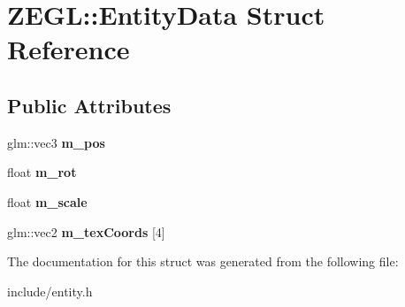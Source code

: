 \hypertarget{struct_z_e_g_l_1_1_entity_data}{}\section{Z\+E\+G\+L\+:\+:Entity\+Data Struct Reference}
\label{struct_z_e_g_l_1_1_entity_data}
\subsection*{Public Attributes}
\begin{DoxyCompactItemize}
\item 
\hypertarget{struct_z_e_g_l_1_1_entity_data_a766627340a91bddd339100545e291889}{}glm\+::vec3 {\bfseries m\+\_\+pos}\label{struct_z_e_g_l_1_1_entity_data_a766627340a91bddd339100545e291889}

\item 
\hypertarget{struct_z_e_g_l_1_1_entity_data_a315c1d6c3498bdd281c8bf76bd245b1c}{}float {\bfseries m\+\_\+rot}\label{struct_z_e_g_l_1_1_entity_data_a315c1d6c3498bdd281c8bf76bd245b1c}

\item 
\hypertarget{struct_z_e_g_l_1_1_entity_data_aafb6c681a1798a8ba567eb59c171d1ca}{}float {\bfseries m\+\_\+scale}\label{struct_z_e_g_l_1_1_entity_data_aafb6c681a1798a8ba567eb59c171d1ca}

\item 
\hypertarget{struct_z_e_g_l_1_1_entity_data_a02c43242c9cfc0edbd162f172c806380}{}glm\+::vec2 {\bfseries m\+\_\+tex\+Coords} \mbox{[}4\mbox{]}\label{struct_z_e_g_l_1_1_entity_data_a02c43242c9cfc0edbd162f172c806380}

\end{DoxyCompactItemize}


The documentation for this struct was generated from the following file\+:\begin{DoxyCompactItemize}
\item 
include/entity.\+h\end{DoxyCompactItemize}

